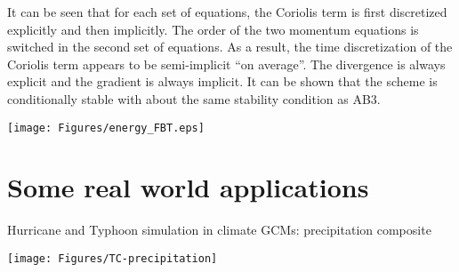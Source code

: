 It can be seen that for each set of equations, the Coriolis term is first discretized explicitly and then implicitly. The order of the two momentum equations is switched in the second set of equations. As a result, the time discretization of the Coriolis term appears to be semi-implicit ``on average''. The divergence is always explicit and the gradient is always implicit. It can be shown that the scheme is conditionally stable with about the same stability condition as AB3.

\begin{center}
	\texttt{[image: Figures/energy\_FBT.eps]}
\end{center}

\section{Some real world applications}
{Hurricane and Typhoon simulation in climate GCMs: precipitation composite}

\begin{center}	
	\texttt{[image: Figures/TC-precipitation]}
\end{center}
